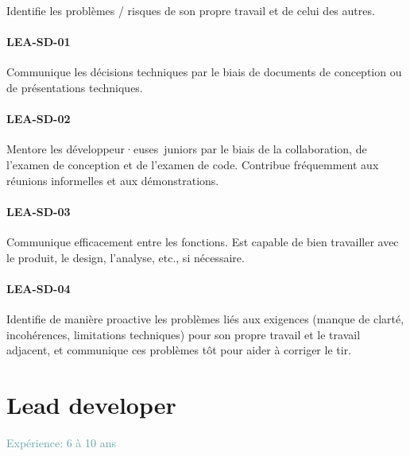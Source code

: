 \documentclass[a4paper, french, openany, 12pt]{book}
\newcommand\cha[1]{\textcolor{OliveGreen}{\textbf{\uppercase{lea-{#1}}}}}
\newcommand\xp[1]{\textcolor{CadetBlue}{Expérience: {#1} ans}}
\newcommand\devs{développeur·euses}
\begin{document}
\begin{multicols}{2}
  Identifie les problèmes / risques de son propre travail et de celui des autres.

  \subsubsection*{\cha{sd-01}}

  Communique les décisions techniques par le biais de documents de conception ou de présentations techniques.

  \subsubsection*{\cha{sd-02}}

  Mentore les \devs\ juniors par le biais de la collaboration, de l'examen de conception et de l'examen de code. 
  Contribue fréquemment aux réunions informelles et aux démonstrations.

  \subsubsection*{\cha{sd-03}}

  Communique efficacement entre les fonctions.
  Est capable de bien travailler avec le produit, le design, l'analyse, etc., si nécessaire.

  \subsubsection*{\cha{sd-04}}

  Identifie de manière proactive les problèmes liés aux exigences (manque de clarté, incohérences, limitations techniques)
  pour son propre travail et le travail adjacent, et communique ces problèmes tôt pour aider à corriger le tir.

\end{multicols}

\chapter{Lead developer}

\xp{6 à 10}
\end{document}
